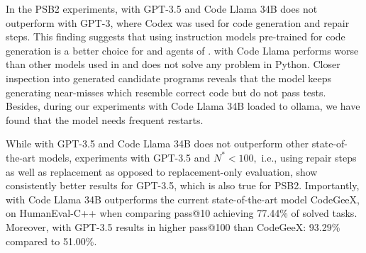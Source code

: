 In the PSB2 experiments, \method{} with GPT-3.5 and Code Llama 34B does not outperform \method{} with GPT-3, where Codex was used for code generation and repair steps. 
This finding suggests that using instruction models pre-trained for code generation is a better choice for  \synthesize{} and \debug{} agents of \method{}. 
\method{} with Code Llama performs worse than other models used in \method{} and does not solve any problem in Python. 
Closer inspection into generated candidate programs reveals that the model keeps generating near-misses which resemble correct code but do not pass tests.
Besides, during our experiments with Code Llama 34B loaded to ollama, we have found that the model needs frequent restarts. 

While \method{} with GPT-3.5 and Code Llama 34B does not outperform other state-of-the-art models, \method{} experiments with GPT-3.5 and $N^*<100,$ i.e., using repair steps as well as replacement as opposed to replacement-only evaluation, show consistently better results for GPT-3.5, which is also true for PSB2.  
Importantly, \method{}  with Code Llama 34B outperforms the current state-of-the-art model CodeGeeX, on HumanEval-C++ when comparing pass@10 achieving 77.44\% of solved tasks.
Moreover, \method{} with GPT-3.5 results in higher pass@100 than CodeGeeX: 93.29\% compared to 51.00\%. 

